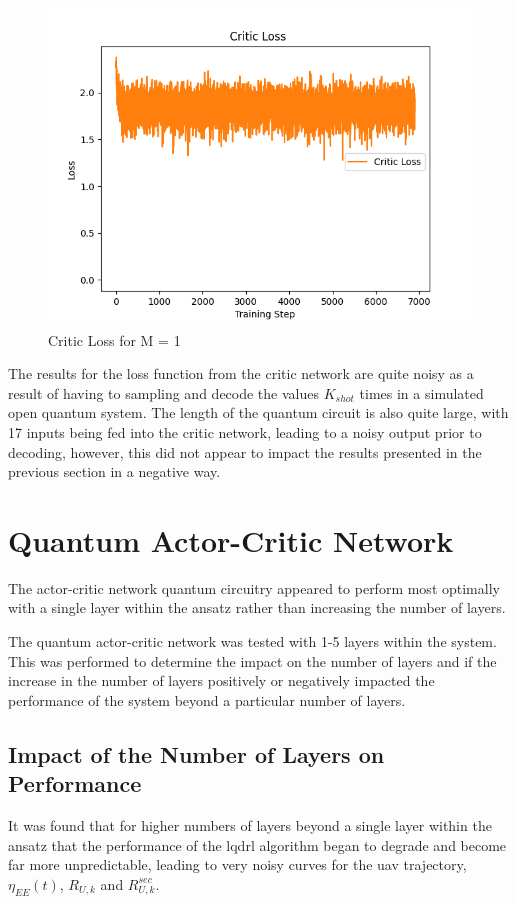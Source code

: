 \begin{figure}[ht!]
    \centering
    \includegraphics[width=0.75\linewidth]{figures/test9/1_layers_losses.png}
    \caption{Critic Loss for M = 1}
    \label{fig:single_layer_critic_loss}
\end{figure}
The results for the loss function from the critic network are quite noisy as a result of having to sampling and decode the values $K_{shot}$ times in a simulated open quantum system. 
The length of the quantum circuit is also quite large, with 17 inputs being fed into the critic network, leading to a noisy output prior to decoding, however, this did not appear to impact the results presented in the previous section in a negative way. 
\section{Quantum Actor-Critic Network}
The actor-critic network quantum circuitry appeared to perform most optimally with a single layer within the ansatz rather than increasing the number of layers. 

The quantum actor-critic network was tested with 1-5 layers within the system. 
This was performed to determine the impact on the number of layers and if the increase in the number of layers positively or negatively impacted the performance of the system beyond a particular number of layers. 

\subsection{Impact of the Number of Layers on Performance}
It was found that for higher numbers of layers beyond a single layer within the ansatz that the performance of the \acrshort{lqdrl} algorithm began to degrade and become far more unpredictable, leading to very noisy curves for the \acrshort{uav} trajectory, $\eta_{EE} (t)$, $R_{U, k}$ and $R_{U, k}^{sec}$. 

